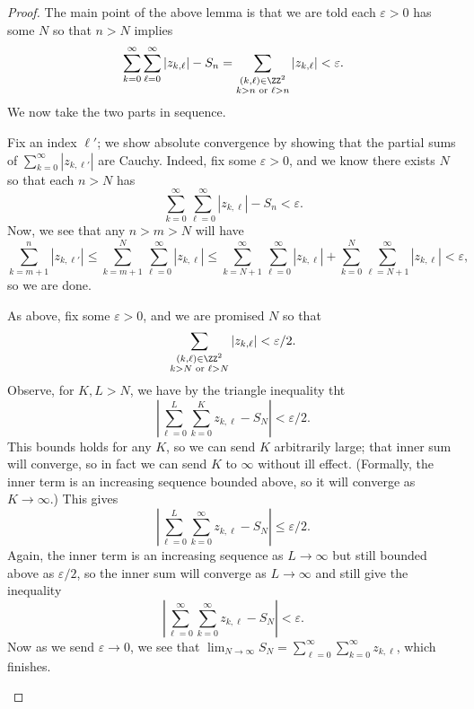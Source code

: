 \begin{proof}
	The main point of the above lemma is that we are told each $\varepsilon>0$ has some $N$ so that $n>N$ implies
	\[\sum_{k=0}^\infty\sum_{\ell=0}^\infty|z_{k,\ell}|-S_n=\sum_{\substack{(k,\ell)\in\ZZ^2\\k>n\text{ or }\ell>n}}|z_{k,\ell}|<\varepsilon.\]
	We now take the two parts in sequence.
	\begin{listalph}
		\item Fix an index $\ell'$; we show absolute convergence by showing that the partial sums of $\sum_{k=0}^\infty|z_{k,\ell'}|$ are Cauchy. Indeed, fix some $\varepsilon>0$, and we know there exists $N$ so that each $n>N$ has
		\[\sum_{k=0}^\infty\sum_{\ell=0}^\infty|z_{k,\ell}|-S_n<\varepsilon.\]
		Now, we see that any $n>m>N$ will have
		\[\sum_{k=m+1}^n|z_{k,\ell'}|\le\sum_{k=m+1}^N\sum_{\ell=0}^\infty|z_{k,\ell}|\le\sum_{k=N+1}^\infty\sum_{\ell=0}^\infty|z_{k,\ell}|+\sum_{k=0}^N\sum_{\ell=N+1}^\infty|z_{k,\ell}|<\varepsilon,\]
		so we are done.
		\item As above, fix some $\varepsilon>0$, and we are promised $N$ so that
		\[\sum_{\substack{(k,\ell)\in\ZZ^2\\k>N\text{ or }\ell>N}}|z_{k,\ell}|<\varepsilon/2.\]
		Observe, for $K,L>N$, we have by the triangle inequality tht
		\[\left|\sum_{\ell=0}^L\sum_{k=0}^Kz_{k,\ell}-S_N\right|<\varepsilon/2.\]
		This bounds holds for any $K$, so we can send $K$ arbitrarily large; that inner sum will converge, so in fact we can send $K$ to $\infty$ without ill effect. (Formally, the inner term is an increasing sequence bounded above, so it will converge as $K\to\infty$.) This gives
		\[\left|\sum_{\ell=0}^L\sum_{k=0}^\infty z_{k,\ell}-S_N\right|\le\varepsilon/2.\]
		Again, the inner term is an increasing sequence as $L\to\infty$ but still bounded above as $\varepsilon/2$, so the inner sum will converge as $L\to\infty$ and still give the inequality
		\[\left|\sum_{\ell=0}^\infty\sum_{k=0}^\infty z_{k,\ell}-S_N\right|<\varepsilon.\]
		Now as we send $\varepsilon\to0$, we see that $\lim_{N\to\infty}S_N=\sum_{\ell=0}^\infty\sum_{k=0}^\infty z_{k,\ell}$, which finishes.\qedhere
	\end{listalph}
\end{proof}

